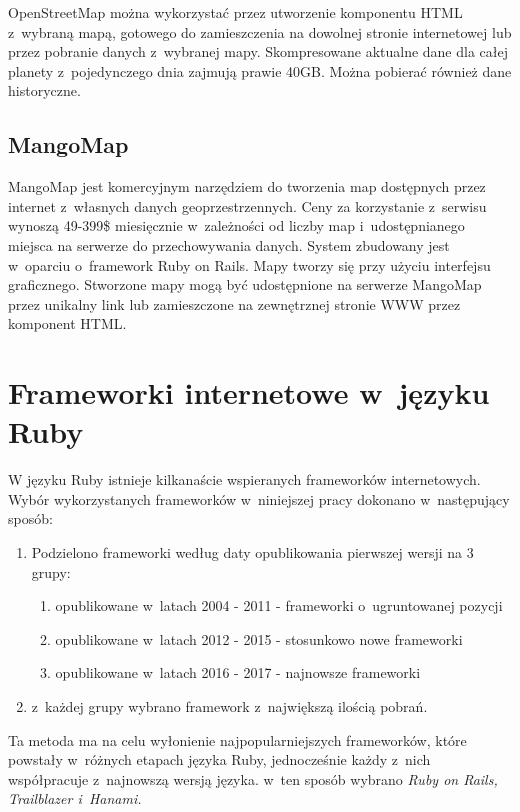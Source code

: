 \documentclass[printmode]{mgr}
\begin{document}
  OpenStreetMap można wykorzystać przez utworzenie komponentu HTML z~wybraną mapą, gotowego do zamieszczenia na dowolnej stronie internetowej lub przez pobranie danych z~wybranej mapy. Skompresowane aktualne dane dla całej planety z~pojedynczego dnia zajmują prawie 40GB. Można pobierać również dane historyczne.

\section{MangoMap}

  MangoMap jest komercyjnym narzędziem do tworzenia map dostępnych przez internet z~własnych danych geoprzestrzennych. Ceny za korzystanie z~serwisu wynoszą 49-399\$ miesięcznie w~zależności od liczby map i~udostępnianego miejsca na serwerze do przechowywania danych. System zbudowany jest w~oparciu o~framework Ruby on Rails. Mapy tworzy się przy użyciu interfejsu graficznego. Stworzone mapy mogą być udostępnione na serwerze MangoMap przez unikalny link lub zamieszczone na zewnętrznej stronie WWW przez komponent HTML\cite{doc_mango}.

\chapter{Frameworki internetowe w~języku Ruby}

W języku Ruby istnieje kilkanaście wspieranych frameworków internetowych. Wybór wykorzystanych frameworków w~niniejszej pracy dokonano w~następujący sposób:
  \begin{enumerate}
    \item Podzielono frameworki według daty opublikowania pierwszej wersji na 3 grupy:
    \begin{enumerate}
      \item opublikowane w~latach 2004 - 2011 - frameworki o~ugruntowanej pozycji
      \item opublikowane w~latach 2012 - 2015 - stosunkowo nowe frameworki
      \item opublikowane w~latach 2016 - 2017 - najnowsze frameworki
    \end{enumerate}
    \item z~każdej grupy wybrano framework z~największą ilością pobrań.
  \end{enumerate}
Ta metoda ma na celu wyłonienie najpopularniejszych frameworków, które powstały w~różnych etapach języka Ruby, jednocześnie każdy z~nich współpracuje z~najnowszą wersją języka. w~ten sposób wybrano \emph{Ruby on Rails, Trailblazer i~Hanami.}
\end{document}

